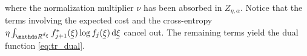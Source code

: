 where the normalization multiplier $\nu$ has been absorbed in $Z_{\eta, \alpha}$.
Notice that the terms involving the expected cost 
and the cross-entropy $\eta \int_{\IR^{\dimVarCem}} \pdf_{j+1}^{\ast}(\vVarCem) \log \pdf_j(\vVarCem) \dd \vVarCem$ cancel out. 
The remaining terms yield the dual function \cref{eq:tr_dual}.





